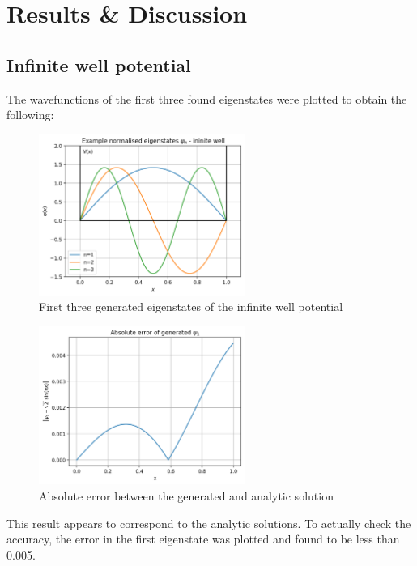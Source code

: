 \documentclass[11pt]{article}
\begin{document}
\section{Results \& Discussion}

\subsection{Infinite well potential}

The wavefunctions of the first three found eigenstates were plotted to
obtain the following:

\begin{figure}[htbp]
  \centering
  \includegraphics*[width=0.6\textwidth]{ex_eigenstates1.png}
  \caption{First three generated eigenstates of the infinite well potential}
\end{figure}


\begin{figure}
  \vspace{-1cm}
  \centering
  \includegraphics*[width=0.6\textwidth]{error_sin.png}
  \caption{Absolute error between the generated and analytic solution}
\end{figure}

\vspace{1cm}

This result appears to correspond to the analytic solutions. To actually
check the accuracy, the error in the first eigenstate was plotted and found to
be less than 0.005.
\end{document}

